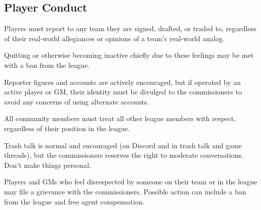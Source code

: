 \subsection{Player Conduct}
\begin{deepEnumerate}
	\item Players must report to any team they are signed, drafted, or traded to, regardless of their real-world allegiances or opinions of a team's real-world analog.
	\begin{deepEnumerate}
		\item Quitting or otherwise becoming inactive chiefly due to these feelings	may be met with a ban from the league.
	\end{deepEnumerate}
	\item Reporter figures and accounts are actively encouraged,
	\label{sec:reporters}
	but if operated by an active player or GM, their identity must be divulged to the commissioners	to avoid any concerns of using alternate accounts.
	\item All community members must treat all other league members with respect, regardless of their position in the league.
	\begin{deepEnumerate}
		\item Trash talk is normal and encouraged (on Discord and in trash talk and game threads), but the commissioners reserves the right to moderate conversations.
		Don't make things personal.
		\item Players and GMs who feel disrespected by someone on their team or in the league may file a grievance with the commissioners.
		Possible action can include a ban from the league and free agent compensation.
	\end{deepEnumerate}
\end{deepEnumerate}